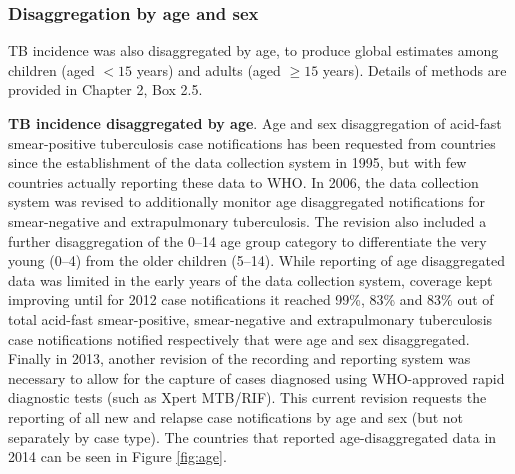 \subsubsection{Disaggregation by age and sex}

TB incidence was also disaggregated by age, to produce global estimates among children (aged $< 15$ years) and adults (aged $\geq 15$ years). Details of methods are provided in Chapter 2, Box 2.5.  

\textbf{TB incidence disaggregated by age}. Age and sex disaggregation of acid-fast smear-positive tuberculosis case notifications has been requested from countries since the establishment of the data collection system in 1995, but with few countries actually reporting these data to WHO. In 2006, the data collection system was revised to additionally monitor age disaggregated notifications for smear-negative and extrapulmonary tuberculosis. The revision also included a further disaggregation of the 0–14 age group category to differentiate the very young (0–4) from the older children (5–14). While reporting of age disaggregated data was limited in the early years of the data collection system, coverage kept improving until for 2012 case notifications it reached 99\%, 83\% and 83\% out of total acid-fast smear-positive, smear-negative and extrapulmonary tuberculosis case notifications notified respectively that were age and sex disaggregated. Finally in 2013, another revision of the recording and reporting system was necessary to allow for the capture of cases diagnosed using WHO-approved rapid diagnostic tests (such as Xpert MTB/RIF). This current revision requests the reporting of all new and relapse case notifications by age and sex (but not separately by case type). The countries that reported age-disaggregated data in 2014 can be seen in Figure \ref{fig:age}.


